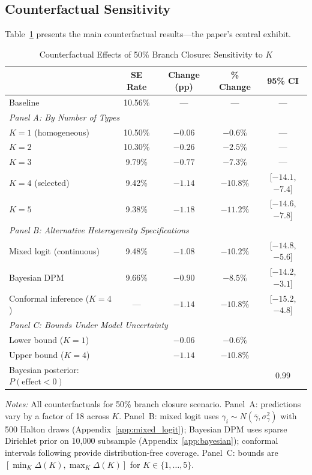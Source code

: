 \documentclass[12pt]{article}
\begin{document}
\subsection{Counterfactual Sensitivity}

Table~\ref{tab:counterfactuals} presents the main counterfactual results---the paper's central exhibit.

\begin{table}[H]
\centering
\caption{Counterfactual Effects of 50\% Branch Closure: Sensitivity to $K$}
\label{tab:counterfactuals}
\begin{threeparttable}
\begin{tabular}{lcccc}
\toprule
& SE Rate & Change (pp) & \% Change & 95\% CI \\
\midrule
Baseline & 10.56\% & --- & --- & --- \\
[6pt]
\multicolumn{5}{l}{\textit{Panel A: By Number of Types}} \\
\quad $K=1$ (homogeneous) & 10.50\% & $-0.06$ & $-0.6\%$ & --- \\
\quad $K=2$ & 10.30\% & $-0.26$ & $-2.5\%$ & --- \\
\quad $K=3$ & 9.79\% & $-0.77$ & $-7.3\%$ & --- \\
\quad $K=4$ (selected) & 9.42\% & $-1.14$ & $-10.8\%$ & [$-14.1$, $-7.4$] \\
\quad $K=5$ & 9.38\% & $-1.18$ & $-11.2\%$ & [$-14.6$, $-7.8$] \\
[6pt]
\multicolumn{5}{l}{\textit{Panel B: Alternative Heterogeneity Specifications}} \\
\quad Mixed logit (continuous) & 9.48\% & $-1.08$ & $-10.2\%$ & [$-14.8$, $-5.6$] \\
\quad Bayesian DPM & 9.66\% & $-0.90$ & $-8.5\%$ & [$-14.2$, $-3.1$] \\
\quad Conformal inference ($K=4$) & --- & $-1.14$ & $-10.8\%$ & [$-15.2$, $-4.8$] \\
[6pt]
\multicolumn{5}{l}{\textit{Panel C: Bounds Under Model Uncertainty}} \\
\quad Lower bound ($K=1$) & & $-0.06$ & $-0.6\%$ & \\
\quad Upper bound ($K=4$) & & $-1.14$ & $-10.8\%$ & \\
\quad Bayesian posterior: $P(\text{effect} < 0)$ & & & & 0.99 \\
\bottomrule
\end{tabular}
\begin{tablenotes}
\small
\item \textit{Notes:} All counterfactuals for 50\% branch closure scenario. Panel~A: predictions vary by a factor of 18 across $K$. Panel~B: mixed logit uses $\gamma_i \sim N(\bar{\gamma}, \sigma^2_\gamma)$ with 500 Halton draws (Appendix~\ref{app:mixed_logit}); Bayesian DPM uses sparse Dirichlet prior on 10,000 subsample (Appendix~\ref{app:bayesian}); conformal intervals following \citet{lei2021} provide distribution-free coverage. Panel~C: bounds are $[\min_K \Delta(K), \max_K \Delta(K)]$ for $K \in \{1, \ldots, 5\}$.
\end{tablenotes}
\end{threeparttable}
\end{table}
\end{document}
